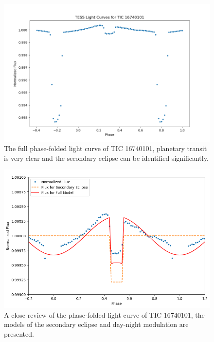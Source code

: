 \documentclass{article}
\begin{document}
\begin{figure}[H]\centering\includegraphics[width=0.7\linewidth]{image/16740101_folded.png}
\captionsetup{font=small} 
\caption{The full phase-folded light curve of TIC 16740101, planetary transit is very clear and the secondary eclipse can be identified significantly.}\label{fig:16740101_folded}\end{figure}\begin{figure}[H]\centering\includegraphics[width=0.65\linewidth]{image/16740101.png}
\captionsetup{font=small} 
\caption{A close review of the phase-folded light curve of TIC 16740101, the models of the secondary eclipse and day-night modulation are presented.}\label{fig:16740101}\end{figure}
\newpage
\end{document}
